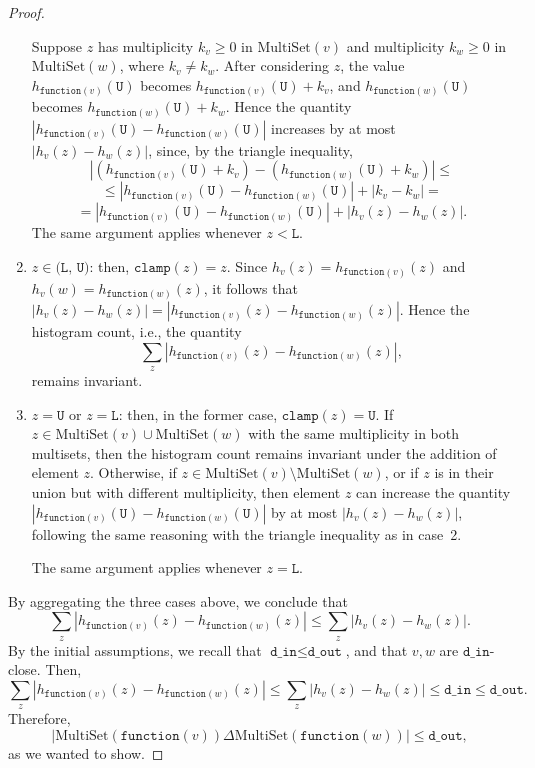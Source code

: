 \documentclass[11pt,a4paper]{article}
\theoremstyle{definition}
\newcommand{\MultiSet}{\mathrm{MultiSet}}
\newcommand{\din}{\texttt{d\_in}}
\newcommand{\dout}{\texttt{d\_out}}
\newcommand{\clamp}{\texttt{clamp}}
\newcommand{\function}{\texttt{function}}
\newcommand{\silvia}[1]{{ {\color{blue}{(silvia)~#1}}}}
\begin{document}
\begin{proof}
\begin{enumerate}
    Suppose $z$ has multiplicity $k_v \geq 0$ in $\MultiSet(v)$ and multiplicity $k_w \geq 0$ in $\MultiSet(w)$, where $k_v \neq k_w$. After considering $z$, the value $h_{\function(v)}(\texttt{U})$ becomes $h_{\function(v)}(\texttt{U}) + k_v$, and $h_{\function(w)}(\texttt{U})$ becomes $h_{\function(w)}(\texttt{U}) + k_w$. Hence the quantity $|h_{\function(v)}(\texttt{U}) - h_{\function(w)}(\texttt{U})|$ increases by at most $|h_v(z) - h_w(z)|$, since, by the triangle inequality,
    \[
         |(h_{\function(v)}(\texttt{U}) + k_v) - (h_{\function(w)}(\texttt{U}) + k_w)| \leq
    \]
    \[
         \leq |h_{\function(v)}(\texttt{U}) - h_{\function(w)}(\texttt{U})| + |k_v - k_w| =
    \]
    \[
        = |h_{\function(v)}(\texttt{U}) - h_{\function(w)}(\texttt{U})| + |h_v(z) - h_w(z)|.
    \]
    The same argument applies whenever $z < \texttt{L}$. 
    
    \silvia{The first subcase discussed here, i.e., when $k_v = k_w$, is also proven by the triangle inequality expression above, but it seemed clean to separate the case where the total sum remains invariant.}
    
    \item $z \in \texttt{(L, U)}$: then, $\clamp(z) = z$. Since $h_v(z) = h_{\function(v)}(z)$ and $h_v(w) = h_{\function(w)}(z)$, it follows that $|h_v(z) - h_w(z)| = |h_{\function(v)}(z) - h_{\function(w)}(z)|$. Hence the histogram count, i.e., the quantity
     \[
        \sum_z |h_{\function(v)}(z) - h_{\function(w)}(z)|,
    \]
    remains invariant.
    
    \item $z = \texttt{U}$ or $z = \texttt{L}$: then, in the former case, $\clamp(z) = \texttt{U}$. If $z \in \MultiSet(v) \cup \MultiSet(w)$ with the same multiplicity in both multisets, then the histogram count remains invariant under the addition of element $z$. Otherwise, if $z \in \MultiSet(v) \setminus \MultiSet(w)$, or if $z$ is in their union but with different multiplicity, then element $z$ can increase the quantity $|h_{\function(v)}(\texttt{U}) - h_{\function(w)}(\texttt{U})|$ by at most $|h_v(z)-h_w(z)|$, following the same reasoning with the triangle inequality as in case~2.
    
    The same argument applies whenever $z = \texttt{L}$.
\end{enumerate}

By aggregating the three cases above, we conclude that
\[
\sum_z |h_{\function(v)}(z) - h_{\function(w)}(z)| \leq \sum_z |h_v(z) - h_w(z)|.
\]
By the initial assumptions, we recall that $\din \leq \dout$, and that $v, w$ are $\din$-close. Then,
\[
\sum_z |h_{\function(v)}(z) - h_{\function(w)}(z)| \leq \sum_z |h_v(z) - h_w(z)| \leq \din \leq \dout.
\]
Therefore, 
\[
|\MultiSet(\function(v)) \Delta \MultiSet(\function(w))| \leq \dout,
\]
as we wanted to show.
\end{proof}

\silvia{Maybe add domain of $z$ below the sum?}
\end{document}
